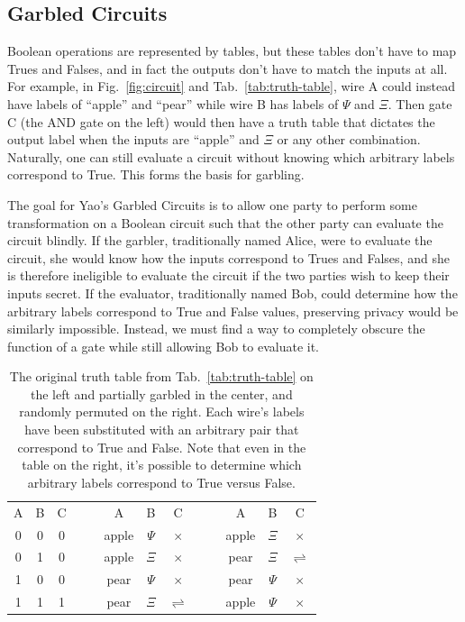 \subsection{Garbled Circuits}
Boolean operations are represented by tables, but these tables don't have to map Trues and Falses, and in fact the outputs don't have to match the inputs at all. For example, in Fig.~\ref{fig:circuit} and Tab.~\ref{tab:truth-table}, wire A could instead have labels of ``apple'' and ``pear'' while wire B has labels of $\Psi$ and $\Xi$. Then gate C (the AND gate on the left) would then have a truth table that dictates the output label when the inputs are ``apple'' and $\Xi$ or any other combination. Naturally, one can still evaluate a circuit without knowing which arbitrary labels correspond to True. This forms the basis for garbling.

The goal for Yao's Garbled Circuits is to allow one party to perform some transformation on a Boolean circuit such that the other party can evaluate the circuit blindly. If the garbler, traditionally named Alice, were to evaluate the circuit, she would know how the inputs correspond to Trues and Falses, and she is therefore ineligible to evaluate the circuit if the two parties wish to keep their inputs secret. If the evaluator, traditionally named Bob, could determine how the arbitrary labels correspond to True and False values, preserving privacy would be similarly impossible. Instead, we must find a way to completely obscure the function of a gate while still allowing Bob to evaluate it.

\begin{table}[t]
	\centering
	\begin{tabular}{cc|c   cc   cc|c   cc   cc|c}
		A & B & C   &&&   A     & B      & C          &&&   A     & B      & C \\
		\cmidrule{1-3}    \cmidrule{6-8}                    \cmidrule{11-13}
		0 & 0 & 0   &&&   apple & $\Psi$ & $\times$   &&&   apple & $\Xi$  & $\times$ \\
		0 & 1 & 0   &&&   apple & $\Xi$  & $\times$   &&&   pear  & $\Xi$  & $\rightleftharpoons$ \\
		1 & 0 & 0   &&&   pear  & $\Psi$ & $\times$   &&&   pear  & $\Psi$ & $\times$ \\
		1 & 1 & 1   &&&   pear  & $\Xi$  & $\rightleftharpoons$   &&&   apple & $\Psi$ & $\times$ \\
	\end{tabular}
	\caption{The original truth table from Tab.~\ref{tab:truth-table} on the left and partially garbled in the center, and randomly permuted on the right. Each wire's labels have been substituted with an arbitrary pair that correspond to True and False. Note that even in the table on the right, it's possible to determine which arbitrary labels correspond to True versus False.}%
	\label{tab:garbled-table}
\end{table}


